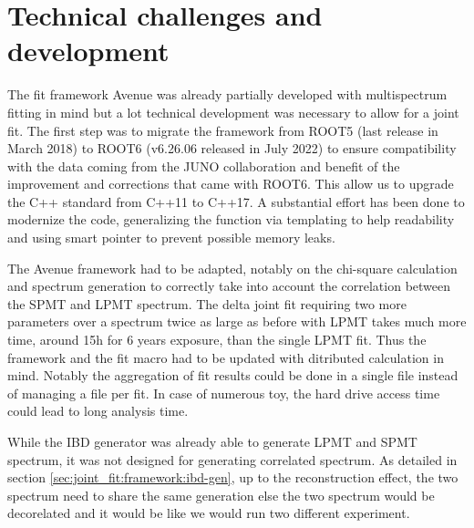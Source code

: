 \documentclass[../main.tex]{subfiles}
\begin{document}
%
%
%
\section{Technical challenges and development}
\label{sec:joint_fit:tech}

The fit framework Avenue was already partially developed with multispectrum fitting in mind but a lot technical development was necessary to allow for a joint fit. The first step was to migrate the framework from ROOT5 (last release in March 2018) to ROOT6 (v6.26.06 released in July 2022) to ensure compatibility with the data coming from the JUNO collaboration and benefit of the improvement and corrections that came with ROOT6. This allow us to upgrade the C++ standard from C++11 to C++17. A substantial effort has been done to modernize the code, generalizing the function via templating to help readability and using smart pointer to prevent possible memory leaks.

The Avenue framework had to be adapted, notably on the chi-square calculation and spectrum generation to correctly take into account the correlation between the SPMT and LPMT spectrum. The delta joint fit requiring two more parameters over a spectrum twice as large as before with LPMT takes much more time, around 15h for 6 years exposure, than the single LPMT fit. Thus the framework and the fit macro had to be updated with ditributed calculation in mind. Notably the aggregation of fit results could be done in a single file instead of managing a file per fit. In case of numerous toy, the hard drive access time could lead to long analysis time.

While the IBD generator was already able to generate LPMT and SPMT spectrum, it was not designed for generating correlated spectrum. As detailed in section \ref{sec:joint_fit:framework:ibd-gen}, up to the reconstruction effect, the two spectrum need to share the same generation else the two spectrum would be decorelated and it would be like we would run two different experiment.
\end{document}
